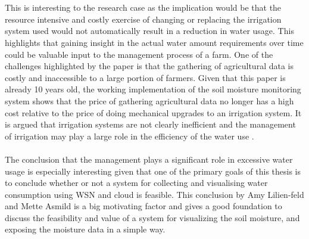 \documentclass[]{uiophd}
\begin{document}
\\\\
This is interesting to the research case as the implication would be that the resource intensive and costly exercise of changing or replacing the irrigation system used would not automatically result in a reduction in water usage. This highlights that gaining insight in the actual water amount requirements over time could be valuable input to the management process of a farm. One of  the challenges highlighted by the paper \cite{LILIENFELD200773} is that the gathering of agricultural data is costly and inaccessible to a large portion of farmers. Given that this paper is already 10 years old, the working implementation of the soil moisture monitoring system shows that the price of gathering agricultural data no longer has a high cost relative to the price of doing mechanical upgrades to an irrigation system. It is argued that irrigation systems are not clearly inefficient and the management of irrigation may play a large role in the efficiency of the water use  \cite{LILIENFELD200773}.
\\\\
The conclusion that the management plays a significant role in excessive water usage is especially interesting given that one of the primary goals of this thesis is to conclude whether or not a system for collecting and visualising water consumption using WSN and cloud is feasible. This conclusion by Amy Lilien-feld and Mette Asmild \cite{LILIENFELD200773} is a big motivating factor and gives a good foundation to discuss the feasibility and value of a system for visualizing the soil moisture, and exposing the moisture data in a simple way.
\end{document}
